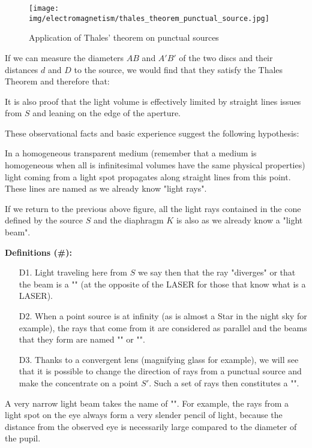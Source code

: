 	\begin{figure}[H]
		\centering
		\texttt{[image: img/electromagnetism/thales\_theorem\_punctual\_source.jpg]}
		\caption{Application of Thales' theorem on punctual sources}
	\end{figure}
	If we can measure the diameters $AB$ and $A'B'$ of the two discs and their distances $d$ and $D$ to the source, we would find that they satisfy the Thales Theorem and therefore that:
	
	It is also proof that the light volume is effectively limited by straight lines issues from $S$ and leaning on the edge of the aperture.
	
	These observational facts and basic experience suggest the following hypothesis: 
	
	In a homogeneous transparent medium (remember that a medium is homogeneous when all is infinitesimal volumes have the same physical properties) light coming from a light spot propagates along straight lines from this point. These lines are named as we already know "light rays".
	
	If we return to the previous above figure, all the light rays contained in the cone defined by the source $S$ and the diaphragm $K$ is also as we already know a "light beam".
	
	\textbf{Definitions (\#\mydef):}
	\begin{enumerate}
		\item[D1.] Light traveling here from $S$ we say then that the ray "diverges" or that the beam is a "" (at the opposite of the LASER for those that know what is a LASER).
		
		\item[D2.] When a point source is at infinity (as is almost a Star in the night sky for example), the rays that come from it are considered as parallel and the beams that they form are named "" or "".
		
		\item[D3.] Thanks to a convergent lens (magnifying glass for example), we will see that it is possible to change the direction of rays from a punctual source and make the concentrate on a point $S'$. Such a set of rays then constitutes a "".
	\end{enumerate}
	
	A very narrow light beam takes the name of "". For example, the rays from a light spot on the eye always form a very slender pencil of light, because the distance from the observed eye is necessarily large compared to the diameter of the pupil.
	
